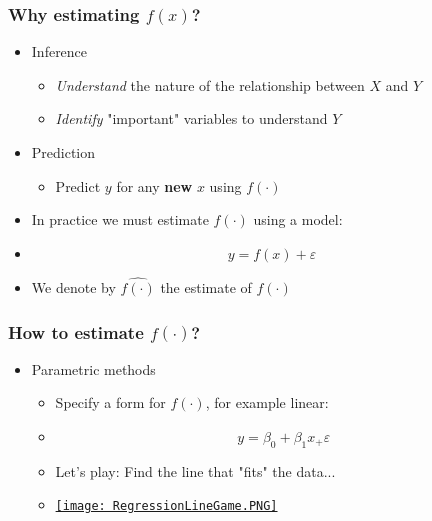 \documentclass[xcolor=x11names,compress, aspectratio=169]{beamer}
\renewcommand{\(}{\begin{columns}}
\renewcommand{\)}{\end{columns}}
\newcommand{\<}[1]{\begin{column}{#1}}
\renewcommand{\>}{\end{column}}
\begin{document}


\begin{frame} %
\frametitle{Why estimating $f(x)$?}
\pause

 \begin{itemize}
  \item<+-> Inference
   \begin{itemize}
  \item<+->[] \textit{Understand} the nature of the relationship between $X$ and $Y$
  \item<+->[] \textit{Identify}  "important" variables to understand $Y$
 \end{itemize}
  \item<+-> Prediction
   \begin{itemize}
  \item<+->[] Predict $y$ for any \textbf{new} $x$ using $f(\cdot)$
 \end{itemize}
 \item<+-> In practice we must estimate  $f(\cdot)$ using a model:
 \item<+->[] $$ y = f(x) + \varepsilon $$
 \item<+->[] We denote by $\widehat{f(\cdot)}$ the estimate of $f(\cdot)$
 \end{itemize}
\end{frame}


\begin{frame} %
\frametitle{How to estimate $f(\cdot)$?}
 \begin{itemize}
  \item<+-> Parametric methods
   \begin{itemize}[<+->]
      \item[] Specify a form for $f(\cdot)$, for example linear:
      \item[] $$y = \beta_0 + \beta_1 x_ + \varepsilon$$
      \item Let's play: Find the line that "fits" the data...
      \item[]  \href{https://xtophedataviz.shinyapps.io/RegressionApp/}{\texttt{[image: RegressionLineGame.PNG]}}
 \end{itemize}
 \end{itemize}
\end{frame}
\end{document}
